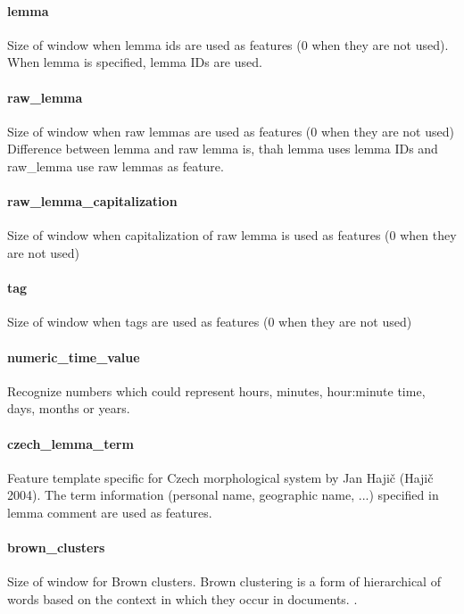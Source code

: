 \paragraph{lemma}
Size of window when lemma ids are used as features (0 when they are not used).
When lemma is specified, lemma IDs are used.

\paragraph{raw\_lemma}
Size of window when raw lemmas are used as features (0 when they are not used)
Difference between lemma and raw lemma is, thah lemma uses lemma IDs and raw\_lemma use raw lemmas as feature.

\paragraph{raw\_lemma\_capitalization}
Size of window when capitalization of raw lemma is used as features (0 when they are not used)

\paragraph{tag}
Size of window when tags are used as features (0 when they are not used)

\paragraph{numeric\_time\_value}
Recognize numbers which could represent hours, minutes, hour:minute time, days,
months or years.

\paragraph{czech\_lemma\_term}
Feature template specific for Czech morphological system by Jan Hajič (Hajič 2004).
The term information (personal name, geographic name, ...) specified in lemma comment
are used as features.

\paragraph{brown\_clusters}
Size of window for Brown clusters.
Brown clustering is a form of hierarchical of words based on the context in which they occur in documents. .

